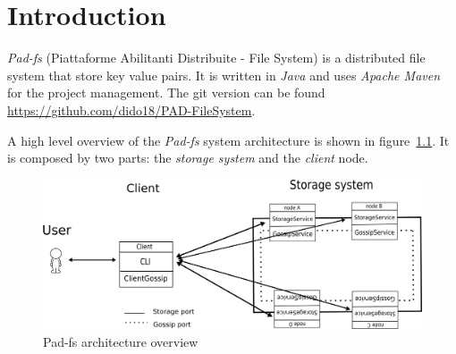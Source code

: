 \chapter{Introduction}\label{ch:introduction}
\emph{Pad-fs} (Piattaforme Abilitanti Distribuite - File System) is a distributed file system that store key value pairs. It is written in \textit{Java}  and uses \textit{Apache Maven} for the project management. The git version can be found \url{https://github.com/dido18/PAD-FileSystem}.

A high level overview of the \emph{Pad-fs} system architecture is shown in figure~\ref{fig:architecture}. It is composed by two parts: the \textit{storage system} and the \textit{client} node.
\begin{figure}
\centering
\includegraphics[scale=0.5]{figures/architecture.png}
\caption{Pad-fs architecture overview}
\label{fig:architecture}
\end{figure}

